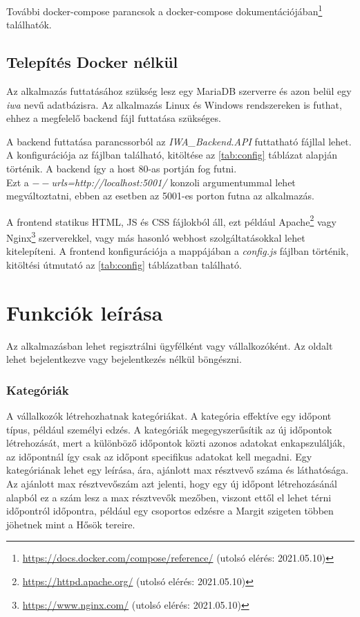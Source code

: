 További docker-compose parancsok a docker-compose dokumentációjában\footnote{\url{https://docs.docker.com/compose/reference/} (utolsó elérés: 2021.05.10)} találhatók.

\subsection{Telepítés Docker nélkül}

Az alkalmazás futtatásához szükség lesz egy MariaDB szerverre és azon belül egy \textit{iwa} nevű adatbázisra. Az alkalmazás Linux és Windows rendszereken is futhat, ehhez a megfelelő backend fájl futtatása szükséges.

A backend futtatása parancssorból az \textit{IWA\_Backend.API} futtatható fájllal lehet. A konfigurációja az  fájlban található, kitöltése az \ref{tab:config} táblázat alapján történik. A backend így a host 80-as portján fog futni. \\ Ezt a \textit{$--$urls=http://localhost:5001/} konzoli argumentummal lehet megváltoztatni, ebben az esetben az 5001-es porton futna az alkalmazás.

A frontend statikus HTML, JS és CSS fájlokból áll, ezt például Apache\footnote{\url{https://httpd.apache.org/} (utolsó elérés: 2021.05.10)} vagy Nginx\footnote{\url{https://www.nginx.com/} (utolsó elérés: 2021.05.10)} szerverekkel, vagy más hasonló webhost szolgáltatásokkal lehet kitelepíteni. A frontend konfigurációja a mappájában a \textit{config.js} fájlban történik, kitöltési útmutató az \ref{tab:config} táblázatban található.

\section{Funkciók leírása}
\label{sec:functionDefinitions}

Az alkalmazásban lehet regisztrálni ügyfélként vagy vállalkozóként. Az oldalt lehet bejelentkezve vagy bejelentkezés nélkül böngészni.

\subsubsection{Kategóriák}

A vállalkozók létrehozhatnak kategóriákat. A kategória effektíve egy időpont típus, például személyi edzés. A kategóriák megegyszerűsítik az új időpontok létrehozását, mert a különböző időpontok közti azonos adatokat enkapszulálják, az időpontnál így csak az időpont specifikus adatokat kell megadni. Egy kategóriának lehet egy leírása, ára, ajánlott max résztvevő száma és láthatósága. Az ajánlott max résztvevőszám azt jelenti, hogy egy új időpont létrehozásánál alapból ez a szám lesz a max résztvevők mezőben, viszont ettől el lehet térni időpontról időpontra, például egy csoportos edzésre a Margit szigeten többen jöhetnek mint a Hősök tereire.

